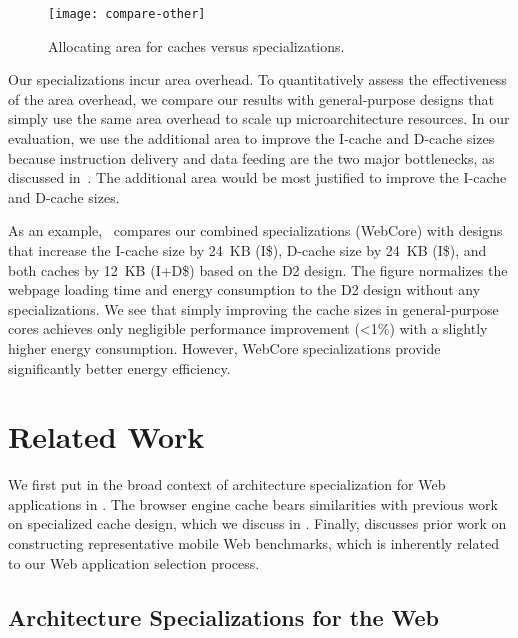 \begin{figure}[t]
\centering
\texttt{[image: compare-other]}
\caption{Allocating area for caches versus specializations.}
\label{fig:compare-other}
\end{figure}

Our specializations incur area overhead. To quantitatively assess the effectiveness of the area overhead, we compare our results with general-purpose designs that simply use the same area overhead to scale up microarchitecture resources. In our evaluation, we use the additional area to improve the I-cache and D-cache sizes because instruction delivery and data feeding are the two major bottlenecks, as discussed in~. The additional area would be most  justified to improve the I-cache and D-cache sizes.

As an example,~ compares our combined specializations (WebCore) with designs that increase the I-cache size by 24~KB (I\$), D-cache size by 24~KB (I\$), and both caches by 12~KB (I+D\$) based on the D2 design. The figure normalizes the webpage loading time and energy consumption to the D2 design without any specializations. We see that simply improving the cache sizes in general-purpose cores achieves only negligible performance improvement (\textless 1\%) with a slightly higher energy consumption. However, WebCore specializations provide significantly better energy efficiency.

\section{Related Work}
\label{sec:arch:related}

We first put \webcore in the broad context of architecture specialization for Web applications in . The browser engine cache bears similarities with previous work on specialized cache design, which we discuss in . Finally,  discusses prior work on constructing representative mobile Web benchmarks, which is inherently related to our Web application selection process.

\subsection{Architecture Specializations for the Web}
\label{sec:arch:related:specialization}

